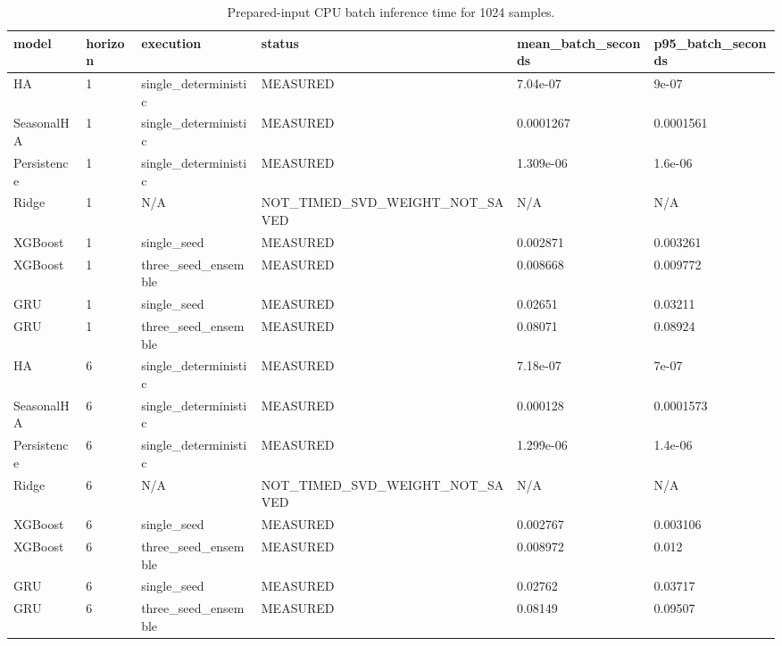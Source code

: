 \begin{table}[!htbp]
\centering
\caption{Prepared-input CPU batch inference time for 1024 samples.}
\begin{tabular}{llllll}
\hline
model & horizon & execution & status & mean\_batch\_seconds & p95\_batch\_seconds \\ 
\hline
HA & 1 & single\_deterministic & MEASURED & 7.04e-07 & 9e-07 \\
SeasonalHA & 1 & single\_deterministic & MEASURED & 0.0001267 & 0.0001561 \\
Persistence & 1 & single\_deterministic & MEASURED & 1.309e-06 & 1.6e-06 \\
Ridge & 1 & N/A & NOT\_TIMED\_SVD\_WEIGHT\_NOT\_SAVED & N/A & N/A \\
XGBoost & 1 & single\_seed & MEASURED & 0.002871 & 0.003261 \\
XGBoost & 1 & three\_seed\_ensemble & MEASURED & 0.008668 & 0.009772 \\
GRU & 1 & single\_seed & MEASURED & 0.02651 & 0.03211 \\
GRU & 1 & three\_seed\_ensemble & MEASURED & 0.08071 & 0.08924 \\
HA & 6 & single\_deterministic & MEASURED & 7.18e-07 & 7e-07 \\
SeasonalHA & 6 & single\_deterministic & MEASURED & 0.000128 & 0.0001573 \\
Persistence & 6 & single\_deterministic & MEASURED & 1.299e-06 & 1.4e-06 \\
Ridge & 6 & N/A & NOT\_TIMED\_SVD\_WEIGHT\_NOT\_SAVED & N/A & N/A \\
XGBoost & 6 & single\_seed & MEASURED & 0.002767 & 0.003106 \\
XGBoost & 6 & three\_seed\_ensemble & MEASURED & 0.008972 & 0.012 \\
GRU & 6 & single\_seed & MEASURED & 0.02762 & 0.03717 \\
GRU & 6 & three\_seed\_ensemble & MEASURED & 0.08149 & 0.09507 \\
\hline
\end{tabular}
\end{table}
